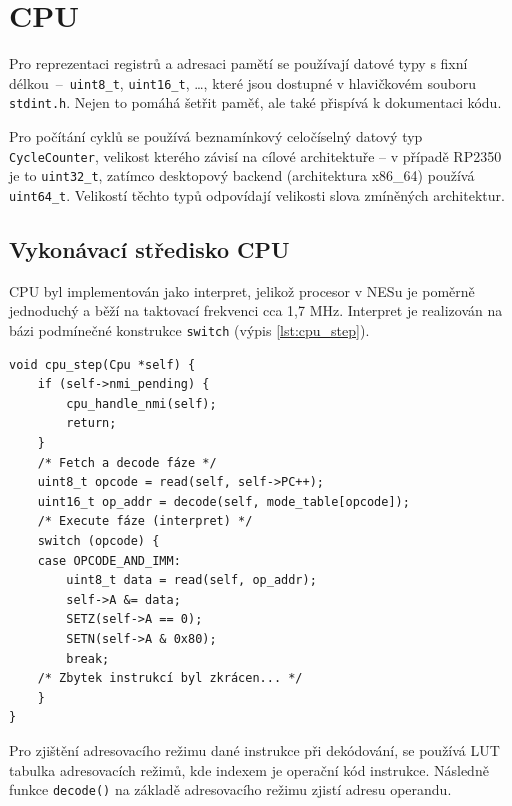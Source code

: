 \section{CPU}


Pro reprezentaci registrů a adresaci pamětí se používají datové typy s fixní
délkou~--~\texttt{uint8\_t}, \texttt{uint16\_t}, \dots, které jsou dostupné v hlavičkovém souboru
\texttt{stdint.h}. Nejen to pomáhá šetřit paměť, ale také přispívá k dokumentaci kódu.

Pro počítání cyklů se používá beznamínkový celočíselný datový typ \texttt{CycleCounter}, velikost
kterého závisí na cílové architektuře -- v případě RP2350 je to \texttt{uint32\_t}, zatímco
desktopový backend (architektura x86\_64) používá \texttt{uint64\_t}. Velikostí těchto typů
odpovídají velikosti slova zmíněných architektur.

\subsection{Vykonávací středisko CPU}

CPU byl implementován jako interpret, jelikož procesor v NESu je poměrně jednoduchý a běží na
taktovací frekvenci cca 1,7 MHz. Interpret je realizován na bázi podmínečné konstrukce
\texttt{switch} (výpis \ref{lst:cpu_step}).

\begin{listing}[htbp]
\begin{verbatim}
void cpu_step(Cpu *self) {
    if (self->nmi_pending) {
        cpu_handle_nmi(self);
        return;
    }
    /* Fetch a decode fáze */
    uint8_t opcode = read(self, self->PC++);
    uint16_t op_addr = decode(self, mode_table[opcode]);
    /* Execute fáze (interpret) */
    switch (opcode) {
    case OPCODE_AND_IMM:
        uint8_t data = read(self, op_addr);
        self->A &= data;
        SETZ(self->A == 0);
        SETN(self->A & 0x80);
        break;
    /* Zbytek instrukcí byl zkrácen... */
    }
}
\end{verbatim}
\caption{Krokovací funkce CPU.}
\label{lst:cpu_step}
\end{listing}

Pro zjištění adresovacího režimu dané instrukce při dekódování, se používá LUT tabulka adresovacích
režimů, kde indexem je operační kód instrukce. Následně funkce \texttt{decode()} na základě adresovacího
režimu zjistí adresu operandu.

